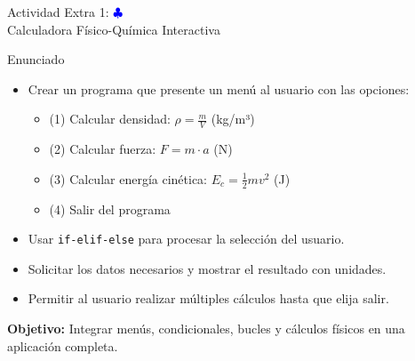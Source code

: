 \documentclass[10pt]{beamer}
\begin{document}
\begin{frame}{Actividad Extra 1: \hfill \textcolor{blue}{$\clubsuit$} \\ Calculadora Físico-Química Interactiva}
  \begin{block}{Enunciado}
    \begin{itemize}
      \item Crear un programa que presente un menú al usuario con las opciones:
        \begin{itemize}
          \item (1) Calcular densidad: \(\rho = \frac{m}{V}\) (kg/m³)
          \item (2) Calcular fuerza: \(F = m \cdot a\) (N)
          \item (3) Calcular energía cinética: \(E_c = \frac{1}{2}mv^2\) (J)
          \item (4) Salir del programa
        \end{itemize}
      \item Usar \texttt{if-elif-else} para procesar la selección del usuario.
      \item Solicitar los datos necesarios y mostrar el resultado con unidades.
      \item Permitir al usuario realizar múltiples cálculos hasta que elija salir.
    \end{itemize}
  \end{block}
  
  \textbf{Objetivo:} Integrar menús, condicionales, bucles y cálculos físicos en una aplicación completa.
\end{frame}
\end{document}
